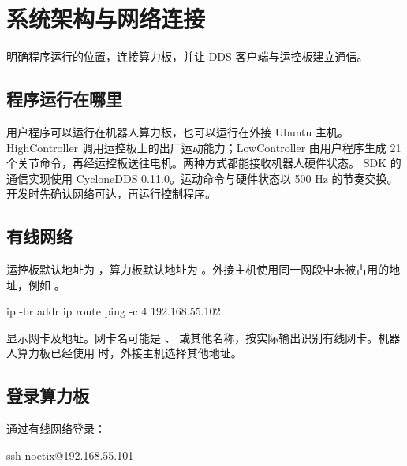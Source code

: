 \chapter{系统架构与网络连接}

\begin{intro}
明确程序运行的位置，连接算力板，并让 DDS 客户端与运控板建立通信。
\end{intro}
\section{程序运行在哪里}
用户程序可以运行在机器人算力板，也可以运行在外接 Ubuntu 主机。HighController 调用运控板上的出厂运动能力；LowController 由用户程序生成 21 个关节命令，再经运控板送往电机。两种方式都能接收机器人硬件状态。
SDK 的通信实现使用 CycloneDDS 0.11.0。运动命令与硬件状态以 500 Hz 的节奏交换。开发时先确认网络可达，再运行控制程序。
\section{有线网络}
运控板默认地址为 ，算力板默认地址为 。外接主机使用同一网段中未被占用的地址，例如 。
\par\noindent\begin{minipage}{\linewidth}
\begin{command}
ip -br addr
ip route
ping -c 4 192.168.55.102
\end{command}
\end{minipage}\par

 显示网卡及地址。网卡名可能是 、 或其他名称，按实际输出识别有线网卡。机器人算力板已经使用  时，外接主机选择其他地址。
\section{登录算力板}
通过有线网络登录：
\par\noindent\begin{minipage}{\linewidth}
\begin{command}
ssh noetix@192.168.55.101
\end{command}
\end{minipage}\par

